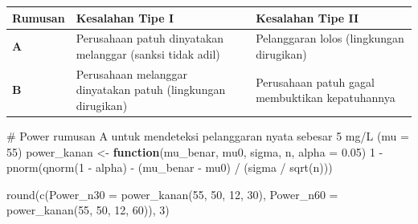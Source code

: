 \documentclass[
  indonesian,
  letterpaper,
]{book}
\newenvironment{Shaded}{\begin{snugshade}}{\end{snugshade}}
\newcommand{\AttributeTok}[1]{\textcolor[rgb]{0.40,0.45,0.13}{#1}}
\newcommand{\CommentTok}[1]{\textcolor[rgb]{0.37,0.37,0.37}{#1}}
\newcommand{\ControlFlowTok}[1]{\textcolor[rgb]{0.00,0.23,0.31}{\textbf{#1}}}
\newcommand{\DecValTok}[1]{\textcolor[rgb]{0.68,0.00,0.00}{#1}}
\newcommand{\FloatTok}[1]{\textcolor[rgb]{0.68,0.00,0.00}{#1}}
\newcommand{\FunctionTok}[1]{\textcolor[rgb]{0.28,0.35,0.67}{#1}}
\newcommand{\NormalTok}[1]{\textcolor[rgb]{0.00,0.23,0.31}{#1}}
\newcommand{\OtherTok}[1]{\textcolor[rgb]{0.00,0.23,0.31}{#1}}
\newcommand{\SpecialCharTok}[1]{\textcolor[rgb]{0.37,0.37,0.37}{#1}}
\newcounter{none} %
\begin{document}
{\def\LTcaptype{none} %
\begin{longtable}[]{@{}
  >{\centering\arraybackslash}p{}
  >{\raggedright\arraybackslash}p{}
  >{\raggedright\arraybackslash}p{}@{}}
\toprule\noalign{}
\begin{minipage}[b]{\linewidth}\centering
Rumusan
\end{minipage} & \begin{minipage}[b]{\linewidth}\raggedright
Kesalahan Tipe I
\end{minipage} & \begin{minipage}[b]{\linewidth}\raggedright
Kesalahan Tipe II
\end{minipage} \\
\midrule\noalign{}
\endhead
\bottomrule\noalign{}
\endlastfoot
\textbf{A} & Perusahaan patuh dinyatakan melanggar (sanksi tidak adil) &
Pelanggaran lolos (lingkungan dirugikan) \\
\textbf{B} & Perusahaan melanggar dinyatakan patuh (lingkungan
dirugikan) & Perusahaan patuh gagal membuktikan kepatuhannya \\
\end{longtable}
}

\begin{Shaded}
\begin{Highlighting}[]
\CommentTok{\# Power rumusan A untuk mendeteksi pelanggaran nyata sebesar 5 mg/L (mu = 55)}
\NormalTok{power\_kanan }\OtherTok{\textless{}{-}} \ControlFlowTok{function}\NormalTok{(mu\_benar, mu0, sigma, n, }\AttributeTok{alpha =} \FloatTok{0.05}\NormalTok{)}
  \DecValTok{1} \SpecialCharTok{{-}} \FunctionTok{pnorm}\NormalTok{(}\FunctionTok{qnorm}\NormalTok{(}\DecValTok{1} \SpecialCharTok{{-}}\NormalTok{ alpha) }\SpecialCharTok{{-}}\NormalTok{ (mu\_benar }\SpecialCharTok{{-}}\NormalTok{ mu0) }\SpecialCharTok{/}\NormalTok{ (sigma }\SpecialCharTok{/} \FunctionTok{sqrt}\NormalTok{(n)))}

\FunctionTok{round}\NormalTok{(}\FunctionTok{c}\NormalTok{(}\AttributeTok{Power\_n30 =} \FunctionTok{power\_kanan}\NormalTok{(}\DecValTok{55}\NormalTok{, }\DecValTok{50}\NormalTok{, }\DecValTok{12}\NormalTok{, }\DecValTok{30}\NormalTok{), }\AttributeTok{Power\_n60 =} \FunctionTok{power\_kanan}\NormalTok{(}\DecValTok{55}\NormalTok{, }\DecValTok{50}\NormalTok{, }\DecValTok{12}\NormalTok{, }\DecValTok{60}\NormalTok{)), }\DecValTok{3}\NormalTok{)}
\end{Highlighting}
\end{Shaded}
\end{document}
